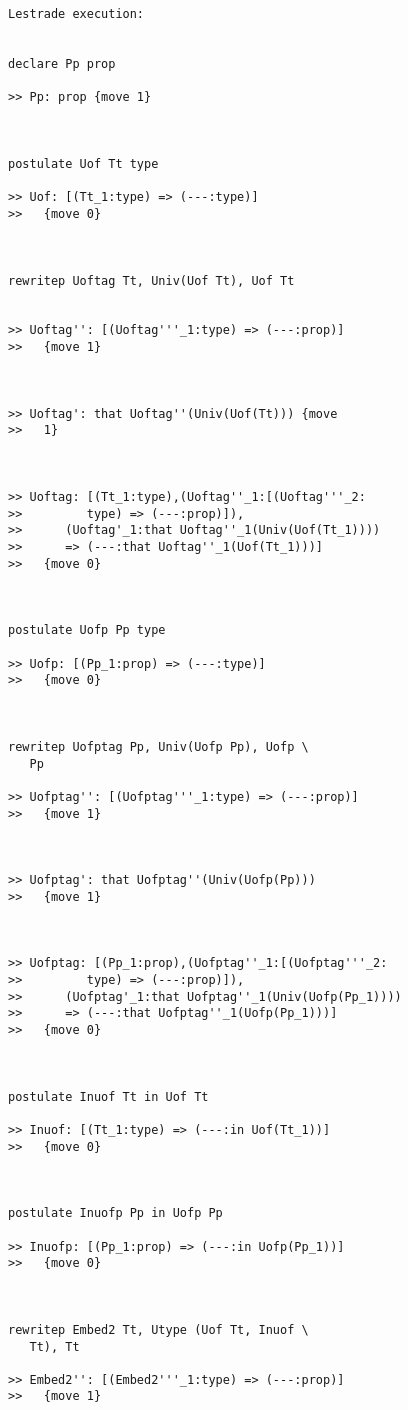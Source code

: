 \documentclass{article}
\begin{document}
\begin{verbatim}Lestrade execution:


declare Pp prop

>> Pp: prop {move 1}



postulate Uof Tt type

>> Uof: [(Tt_1:type) => (---:type)]
>>   {move 0}



rewritep Uoftag Tt, Univ(Uof Tt), Uof Tt


>> Uoftag'': [(Uoftag'''_1:type) => (---:prop)]
>>   {move 1}



>> Uoftag': that Uoftag''(Univ(Uof(Tt))) {move
>>   1}



>> Uoftag: [(Tt_1:type),(Uoftag''_1:[(Uoftag'''_2:
>>         type) => (---:prop)]),
>>      (Uoftag'_1:that Uoftag''_1(Univ(Uof(Tt_1))))
>>      => (---:that Uoftag''_1(Uof(Tt_1)))]
>>   {move 0}



postulate Uofp Pp type

>> Uofp: [(Pp_1:prop) => (---:type)]
>>   {move 0}



rewritep Uofptag Pp, Univ(Uofp Pp), Uofp \
   Pp

>> Uofptag'': [(Uofptag'''_1:type) => (---:prop)]
>>   {move 1}



>> Uofptag': that Uofptag''(Univ(Uofp(Pp)))
>>   {move 1}



>> Uofptag: [(Pp_1:prop),(Uofptag''_1:[(Uofptag'''_2:
>>         type) => (---:prop)]),
>>      (Uofptag'_1:that Uofptag''_1(Univ(Uofp(Pp_1))))
>>      => (---:that Uofptag''_1(Uofp(Pp_1)))]
>>   {move 0}



postulate Inuof Tt in Uof Tt

>> Inuof: [(Tt_1:type) => (---:in Uof(Tt_1))]
>>   {move 0}



postulate Inuofp Pp in Uofp Pp

>> Inuofp: [(Pp_1:prop) => (---:in Uofp(Pp_1))]
>>   {move 0}



rewritep Embed2 Tt, Utype (Uof Tt, Inuof \
   Tt), Tt

>> Embed2'': [(Embed2'''_1:type) => (---:prop)]
>>   {move 1}




\end{verbatim}
\end{document}

